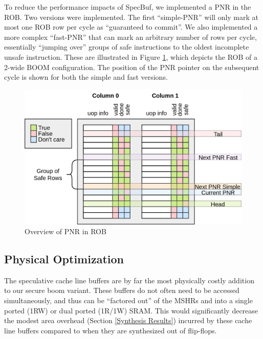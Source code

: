 To reduce the performance impacts of SpecBuf, we implemented a PNR in the ROB. Two versions were implemented. The first ``simple-PNR'' will only mark at most one ROB row per cycle as ``guaranteed to commit''. We also implemented a more complex ``fast-PNR'' that can mark an arbitrary number of rows per cycle, essentially ``jumping over'' groups of safe instructions to the oldest incomplete unsafe instruction. These are illustrated in Figure \ref{PNR}, which depicts the ROB of a 2-wide BOOM configuration. The position of the PNR pointer on the subsequent cycle is shown for both the simple and fast versions.

\begin{figure}[h]
  \begin{center}\includegraphics[scale=0.17]{rob_pnr.png}\end{center}
  \caption{Overview of PNR in ROB}
  \label{PNR}
\end{figure}

\subsection{Physical Optimization}
The speculative cache line buffers are by far the most physically costly addition to our secure boom variant. These buffers do not often need to be accessed simultaneously, and thus can be ``factored out'' of the MSHRs and into a single ported (1RW) or dual ported (1R/1W) SRAM. This would significantly decrease the modest area overhead (Section \ref{Synthesis Results}) incurred by these cache line buffers compared to when they are synthesized out of flip-flops.

